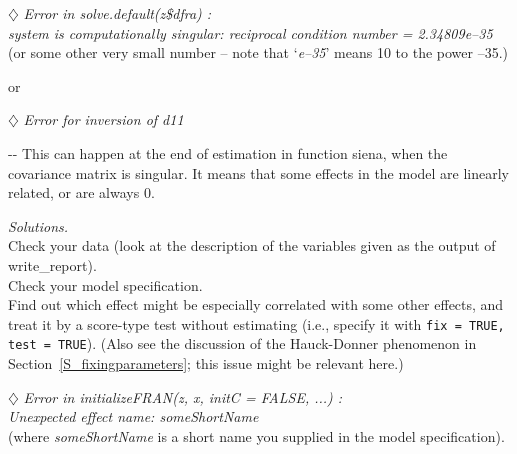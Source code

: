 \documentclass[a4paper,fleqn,11pt]{article}
\makeatletter
\newcommand{\+}{\, + \,}
\newenvironment{indentation}[2]
{\par \setlength{\leftmargin}{#1}       \setlength{\rightmargin}{#2}
  \advance\linewidth -\leftmargin       \advance\linewidth -\rightmargin
  \advance\@totalleftmargin\leftmargin  \@setpar{{\@@par}}%
  \parshape 1 \@totalleftmargin         \linewidth \ignorespaces}{\par}
\makeatother
\begin{document}
\bigskip

\noindent $\diamondsuit$
\emph{Error in solve.default(z\$dfra) : \\
system is computationally singular: reciprocal condition number = 2.34809e--35
}\\
(or some other very small number -- note that `\textit{e--35}' means 10 to the power
--35.)
\smallskip

or
\smallskip

\noindent $\diamondsuit$
\emph{Error for inversion of d11}
\smallskip

\begin{indentation}{0.04\textwidth}{0pt}
\noindent
This can happen at the end of estimation in function \textsf{siena},
when the covariance matrix is singular.
It means that some effects in the model are linearly related,
or are always 0.
\smallskip

\noindent
\emph{Solutions.}\\
Check your data (look at the description of the variables
given as the output of \textsf{write\_report}).\\
Check your model specification.\\
Find out which effect might be especially correlated
with some other effects, and treat it by a score-type
test without estimating (i.e., specify it with
\texttt{fix = TRUE, test = TRUE}).
(Also see the discussion of the Hauck-Donner phenomenon
in Section~\ref{S_fixingparameters}; this issue might
be relevant here.)
\end{indentation}
\bigskip

\noindent $\diamondsuit$ \emph{Error in initializeFRAN(z, x, initC = FALSE, ...) :\\
  Unexpected effect name: someShortName}\\
(where \emph{someShortName} is a short name you supplied in the
model specification).
\smallskip
\end{document}

